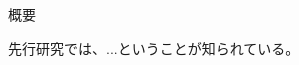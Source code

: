 \documentclass[/Users/ikedahajime/GitHub/reserch/master_report/thesis]{subfiles}
\begin{document}
\begin{center}
\Large{概要}
\end{center}
\normalsize
\thispagestyle{empty}
先行研究では、...ということが知られている。
\end{document}
